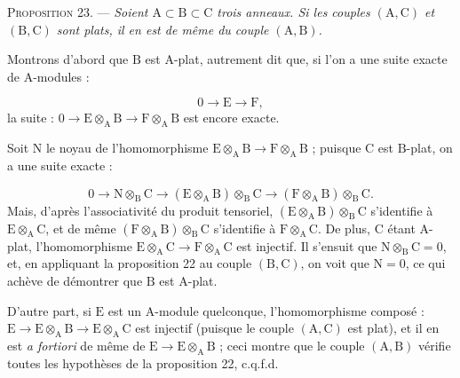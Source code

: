 
\textsc{Proposition 23}. --- \emph{Soient $\mathrm{A} \subset \mathrm{B} \subset \mathrm{C}$ trois anneaux. Si les couples $(\mathrm{A}, \mathrm{C})$ et $(\mathrm{B}, \mathrm{C})$ sont plats, il en est de même du couple $(\mathrm{A}, \mathrm{B})$.}

Montrons d'abord que $\mathrm{B}$ est $\mathrm{A}$-plat, autrement dit que, si l'on a une suite exacte de $\mathrm{A}$-modules :

\begin{equation*}
0 \to \mathrm{E} \to \mathrm{F},
\end{equation*}
la suite : $0 \to \mathrm{E} \otimes_\mathrm{A} \mathrm{B} \to \mathrm{F} \otimes_\mathrm{A} \mathrm{B}$ est encore exacte.

Soit $\mathrm{N}$ le noyau de l'homomorphisme $\mathrm{E} \otimes_\mathrm{A} \mathrm{B} \to \mathrm{F} \otimes_\mathrm{A} \mathrm{B}$ ; puisque $\mathrm{C}$ est $\mathrm{B}$-plat, on a une suite exacte :

\begin{equation*}
0 \to \mathrm{N} \otimes_\mathrm{B} \mathrm{C} \to (\mathrm{E} \otimes_\mathrm{A} \mathrm{B}) \otimes_\mathrm{B} \mathrm{C} \to (\mathrm{F} \otimes_\mathrm{A} \mathrm{B}) \otimes_\mathrm{B} \mathrm{C}.
\end{equation*}
Mais, d'après l'associativité du produit tensoriel, $(\mathrm{E} \otimes_\mathrm{A} \mathrm{B}) \otimes_\mathrm{B} \mathrm{C}$ s'identifie à $\mathrm{E} \otimes_\mathrm{A} \mathrm{C}$, et de même $(\mathrm{F} \otimes_\mathrm{A} \mathrm{B}) \otimes_\mathrm{B} \mathrm{C}$ s'identifie à $\mathrm{F} \otimes_\mathrm{A} \mathrm{C}$. De plus, $\mathrm{C}$ étant $\mathrm{A}$-plat, l'homomorphisme $\mathrm{E} \otimes_\mathrm{A} \mathrm{C} \to \mathrm{F} \otimes_\mathrm{A} \mathrm{C}$ est injectif. Il s'ensuit que $\mathrm{N} \otimes_\mathrm{B} \mathrm{C} = 0$, et, en appliquant la proposition 22 au couple $(\mathrm{B}, \mathrm{C})$, on voit que $\mathrm{N} = 0$, ce qui achève de démontrer que $\mathrm{B}$ est $\mathrm{A}$-plat.

D'autre part, si $\mathrm{E}$ est un $\mathrm{A}$-module quelconque, l'homomorphisme composé : $\mathrm{E} \to \mathrm{E} \otimes_\mathrm{A} \mathrm{B} \to \mathrm{E} \otimes_\mathrm{A} \mathrm{C}$ est injectif (puisque le couple $(\mathrm{A}, \mathrm{C})$ est plat), et il en est \emph{a fortiori} de même de $\mathrm{E} \to \mathrm{E} \otimes_\mathrm{A} \mathrm{B}$ ; ceci montre que le couple $(\mathrm{A}, \mathrm{B})$ vérifie toutes les hypothèses de la proposition 22, c.q.f.d.

